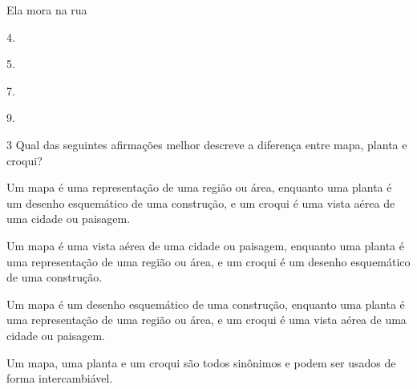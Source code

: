 Ela mora na rua

\begin{multicols}{4}
\begin{escolha}
\item 4.
\item 5.
\item 7.
\item 9.
\end{escolha}
\end{multicols}



\num{3}  Qual das seguintes afirmações melhor descreve a diferença entre mapa,
planta e croqui?

\begin{escolha}
\item
  Um mapa é uma representação de uma região ou área, enquanto uma planta
  é um desenho esquemático de uma construção, e um croqui é uma vista
  aérea de uma cidade ou paisagem.
\item
  Um mapa é uma vista aérea de uma cidade ou paisagem, enquanto uma
  planta é uma representação de uma região ou área, e um croqui é um
  desenho esquemático de uma construção.
\item
  Um mapa é um desenho esquemático de uma construção, enquanto uma
  planta é uma representação de uma região ou área, e um croqui é uma
  vista aérea de uma cidade ou paisagem.
\item
  Um mapa, uma planta e um croqui são todos sinônimos e podem ser usados
  de forma intercambiável.
\end{escolha}


